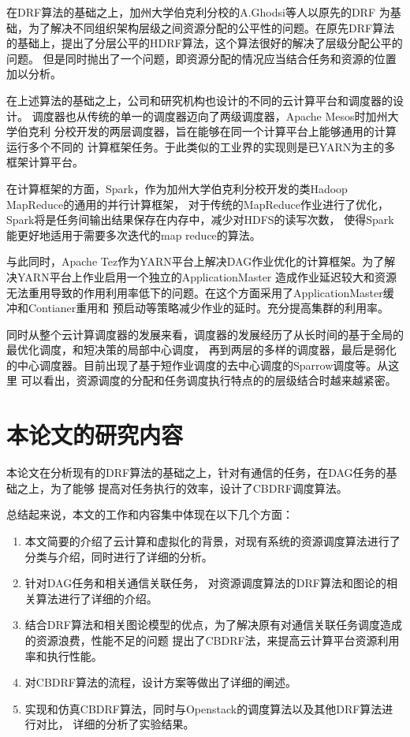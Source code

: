在DRF算法的基础之上，加州大学伯克利分校的A.Ghodsi等人以原先的DRF
为基础，为了解决不同组织架构层级之间资源分配的公平性的问题。在原先DRF算法
的基础上，提出了分层公平的HDRF\cite{ref23}算法，这个算法很好的解决了层级分配公平的问题。
但是同时抛出了一个问题，即资源分配的情况应当结合任务和资源的位置加以分析。

在上述算法的基础之上，公司和研究机构也设计的不同的云计算平台和调度器的设计。
调度器也从传统的单一的调度器迈向了两级调度器，Apache Mesos时加州大学伯克利
分校开发的两层调度器，旨在能够在同一个计算平台上能够通用的计算运行多个不同的
计算框架任务。于此类似的工业界的实现则是已YARN为主的多框架计算平台。

在计算框架的方面，Spark，作为加州大学伯克利分校开发的类Hadoop\cite{ref29}\cite{ref31}\cite{ref32} MapReduce的通用的并行计算框架，
对于传统的MapReduce作业进行了优化，Spark将是任务间输出结果保存在内存中，减少对HDFS的读写次数，
使得Spark能更好地适用于需要多次迭代的map reduce的算法。

与此同时，Apache Tez\cite{ref30}作为YARN\cite{ref22}平台上解决DAG作业\cite{ref21}优化的计算框架。为了解决YARN平台上作业启用一个独立的ApplicationMaster
造成作业延迟较大和资源无法重用导致的作用利用率低下的问题。在这个方面采用了ApplicationMaster缓冲和Contianer重用和
预启动等策略减少作业的延时。充分提高集群的利用率。

同时从整个云计算调度器的发展来看，调度器的发展经历了从长时间的基于全局的最优化调度，和短决策的局部中心调度\cite{ref25}\cite{ref26}\cite{ref27}\cite{ref28}\cite{ref36}，
再到两层的多样的调度器，最后是弱化的中心调度器。目前出现了基于短作业调度的去中心调度的Sparrow\cite{ref20}调度等。从这里
可以看出，资源调度的分配和任务调度执行特点的的层级结合时越来越紧密。

\section{本论文的研究内容}

本论文在分析现有的DRF算法的基础之上，针对有通信的任务，在DAG任务的基础之上，为了能够
提高对任务执行的效率，设计了CBDRF调度算法。

总结起来说，本文的工作和内容集中体现在以下几个方面：
\begin{enumerate}
  \item 本文简要的介绍了云计算和虚拟化的背景，对现有系统的资源调度算法进行了
	分类与介绍，同时进行了详细的分析。
  \item 针对DAG任务和相关通信关联任务，
	对资源调度算法的DRF算法和图论的相关算法进行了详细的介绍。
  \item 结合DRF算法和相关图论模型的优点，为了解决原有对通信关联任务调度造成的资源浪费，性能不足的问题
	提出了CBDRF法，来提高云计算平台资源利用率和执行性能。
  \item 对CBDRF算法的流程，设计方案等做出了详细的阐述。
  \item 实现和仿真CBDRF算法，同时与Openstack的调度算法以及其他DRF算法进行对比，
	详细的分析了实验结果。
\end{enumerate}


